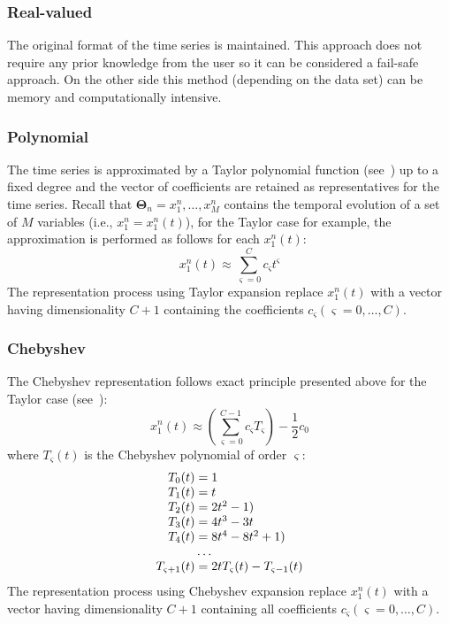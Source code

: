 \subsubsection{Real-valued}
\label{sec:realValued}

The original format of the time series is maintained. This approach does not require any prior knowledge from 
the user so it can be considered a fail-safe approach. On the other side this method
(depending on the data set) can be memory and computationally intensive.

\subsubsection{Polynomial}
\label{sec:polynomial}

The time series is approximated by a Taylor polynomial function (see~\cite{}) up to a 
fixed degree and the vector of coefficients are retained as representatives for the time series. 
Recall that $\bm{\Theta}_n = {x_1^n,\ldots,x_M^n}$ contains the temporal evolution of a set of $M$ 
variables (i.e., $x_1^n = x_1^n (t)$), 
for the Taylor case for example, the approximation is performed as follows for each $x_1^n(t)$:
\begin{equation}
  x_1^n(t) \approx \sum_{\varsigma=0}^C c_\varsigma t^\varsigma
  \label{eq:polynomial}
\end{equation}
The representation process using Taylor expansion replace $x_1^n(t)$ with a vector having dimensionality $C+1$ 
containing the coefficients $c_\varsigma (\varsigma=0,\ldots,C)$.

\subsubsection{Chebyshev}
\label{sec:Chebyshev}

The Chebyshev representation follows exact principle presented above for the Taylor case (see~\cite{}):
\begin{equation}
  x_1^n(t) \approx (\sum_{\varsigma=0}^{C-1} c_\varsigma T_\varsigma) - \frac{1}{2} c_0
  \label{eq:chebyshev}
\end{equation}
where $T_\varsigma(t)$ is the Chebyshev polynomial of order $\varsigma$:
\begin{equation}
\begin{array}{r@{}l}
  T_0(t)&{}=1 \\
  T_1(t)&{}=t \\
  T_2(t)&{}=2 t^2-1) \\
  T_3(t)&{}=4 t^3-3t \\
  T_4(t)&{}=8 t^4-8 t^2+1) \\
        &{}\ldots \\
  T_{\varsigma+1}(t)&{}=2 t T_\varsigma(t)-T_{\varsigma-1}(t)
  \label{eq:ChebyshevPolynomialCoeffs}
\end{array}
\end{equation}
The representation process using Chebyshev expansion replace $x_1^n(t)$ with a vector having dimensionality $C+1$ 
containing all coefficients $c_\varsigma (\varsigma=0,\ldots,C)$. 

